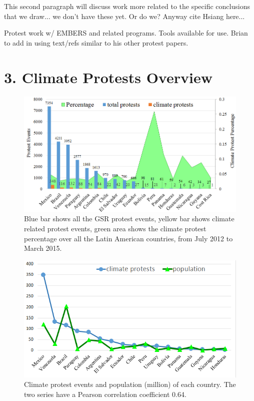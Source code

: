 \documentclass[9pt,twocolumn,twoside]{pnas-new}
\begin{document}
{\color{red} This second paragraph will discuss work more related to the specific conclusions that we draw... we don't have these yet. Or do we? Anyway cite Hsiang here...}

{\color{red} Protest work w/ EMBERS and related programs. Tools available for use. Brian to add in using text/refs similar to his other protest papers.}



\section*{3. Climate Protests Overview}

\begin{figure}[ht]
\centerline
{\includegraphics[width=.45\textwidth]{figures/month-country-protest3}}
\caption{Blue bar shows all the GSR protest events, yellow bar shows climate related protest events, green area shows the climate protest percentage over all the Latin American countries, from July 2012 to March 2015.}
\label{month_percentage}
\end{figure}


\begin{figure}[ht]
\centerline
{\includegraphics[width=.4\textwidth]{figures/protest-population}}
\caption{Climate protest events and population (million) of each country. The two series have a Pearson correlation coefficient 0.64.}
\label{protest-population}
\end{figure}
\end{document}

